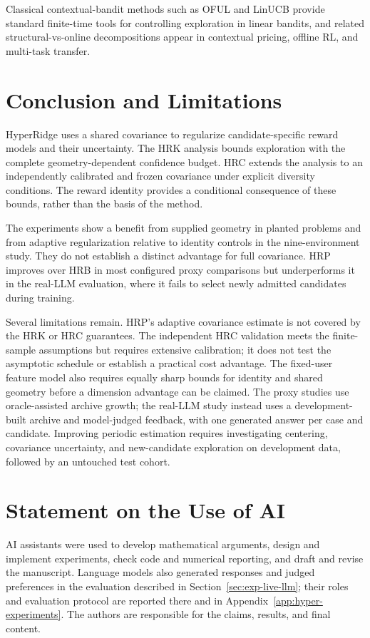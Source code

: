 \documentclass{article} %
\begin{document}
Classical contextual-bandit methods such as OFUL and LinUCB \citep{abbasi2011oful,chu2011linucb,li2010contextual} provide standard finite-time tools for controlling exploration in linear bandits, and related structural-vs-online decompositions appear in contextual pricing, offline RL, and multi-task transfer.

\section{Conclusion and Limitations}
\label{sec:conclusion}

HyperRidge uses a shared covariance to regularize candidate-specific reward
models and their uncertainty. The HRK analysis bounds exploration with the
complete geometry-dependent confidence budget. HRC extends the analysis to
an independently calibrated and frozen covariance under explicit diversity
conditions. The reward identity provides a conditional consequence of these
bounds, rather than the basis of the method.

The experiments show a benefit from supplied geometry in planted problems
and from adaptive regularization relative to identity controls in the
nine-environment study. They do not establish a distinct advantage for full
covariance. HRP improves over HRB in most configured proxy comparisons but
underperforms it in the real-LLM evaluation, where it fails to select newly
admitted candidates during training.

Several limitations remain. HRP's adaptive covariance estimate is not covered
by the HRK or HRC guarantees. The independent HRC validation meets the
finite-sample assumptions but requires extensive calibration; it does not
test the asymptotic schedule or establish a practical cost advantage.
The fixed-user feature
model also requires equally sharp bounds for identity and shared geometry
before a dimension advantage can be claimed. The proxy studies use
oracle-assisted archive growth; the real-LLM study instead uses a
development-built archive and model-judged feedback, with one generated
answer per case and candidate. Improving periodic estimation requires
investigating centering, covariance uncertainty, and new-candidate
exploration on development data, followed by an untouched test cohort.

\clearpage
\section*{Statement on the Use of AI}
AI assistants were used to develop mathematical arguments, design and
implement experiments, check code and numerical reporting, and draft and
revise the manuscript. Language models also generated responses and judged
preferences in the evaluation described in
Section~\ref{sec:exp-live-llm}; their roles and evaluation protocol are
reported there and in Appendix~\ref{app:hyper-experiments}.
The authors are responsible for the claims, results, and final content.
\end{document}
